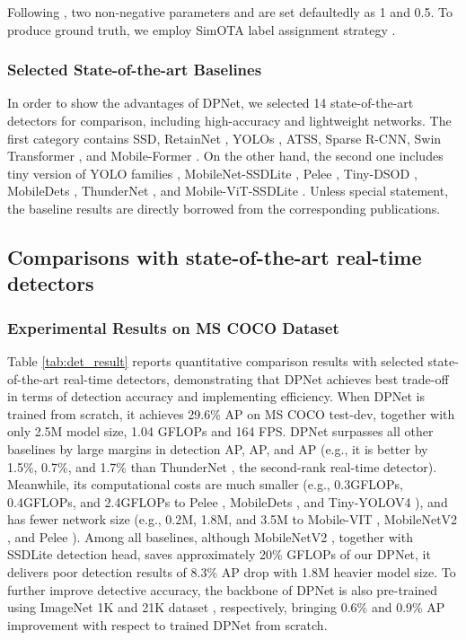 \documentclass[lettersize,journal]{IEEEtran}
\begin{document}
Following \cite{ge2021yolox}, two non-negative parameters  and  are set defaultedly as 1 and 0.5. To produce ground truth, we employ SimOTA label assignment strategy \cite{ge2021ota,ge2021yolox}.

\subsubsection{Selected State-of-the-art Baselines}
In order to show the advantages of DPNet, we selected 14 state-of-the-art detectors for comparison, including high-accuracy and lightweight networks. The first category contains SSD\cite{liu2016ssd}, RetainNet \cite{lin2017focal}, YOLOs \cite{redmon2018yolov3,wang2021scaled}, ATSS\cite{zhang2020bridging}, Sparse R-CNN\cite{sun2021sparse}, Swin Transformer \cite{liu2021Swin}, and Mobile-Former \cite{chen2021mobile}. On the other hand, the second one includes tiny version of YOLO families \cite{redmon2018yolov3,wang2021scaled}, MobileNet-SSDLite \cite{sandler2018mobilenetv2}, Pelee \cite{Pelee}, Tiny-DSOD \cite{li2018tiny}, MobileDets \cite{xiong2021mobiledets}, ThunderNet \cite{qin2019thundernet}, and Mobile-ViT-SSDLite \cite{mehta2021mobilevit}. Unless special statement, the baseline results are directly borrowed from the corresponding publications.

\subsection{Comparisons with state-of-the-art real-time detectors}
\subsubsection{Experimental Results on MS COCO Dataset}
Table \ref{tab:det_result} reports quantitative comparison results with selected state-of-the-art real-time detectors, demonstrating that DPNet achieves best trade-off in terms of detection accuracy and implementing efficiency. When DPNet is trained from scratch, it achieves 29.6\% AP on MS COCO test-dev, together with only 2.5M model size, 1.04 GFLOPs and 164 FPS. DPNet surpasses all other baselines by large margins in detection AP, AP, and AP (e.g., it is better by 1.5\%, 0.7\%, and 1.7\% than ThunderNet \cite{qin2019thundernet}, the second-rank real-time detector). Meanwhile, its computational costs are much smaller (e.g., 0.3GFLOPs, 0.4GFLOPs, and 2.4GFLOPs to Pelee \cite{Pelee}, MobileDets \cite{xiong2021mobiledets}, and Tiny-YOLOV4 \cite{wang2021scaled}), and has fewer network size (e.g., 0.2M, 1.8M, and 3.5M to Mobile-VIT \cite{mehta2021mobilevit}, MobileNetV2 \cite{sandler2018mobilenetv2}, and Pelee \cite{Pelee}). Among all baselines, although MobileNetV2 \cite{sandler2018mobilenetv2}, together with SSDLite detection head, saves approximately 20\% GFLOPs of our DPNet, it delivers poor detection results of 8.3\% AP drop with 1.8M heavier model size. To further improve detective accuracy, the backbone of DPNet is also pre-trained using ImageNet 1K and 21K dataset \cite{deng2009imagenet}, respectively, bringing 0.6\% and 0.9\% AP improvement with respect to trained DPNet from scratch.
\end{document}

